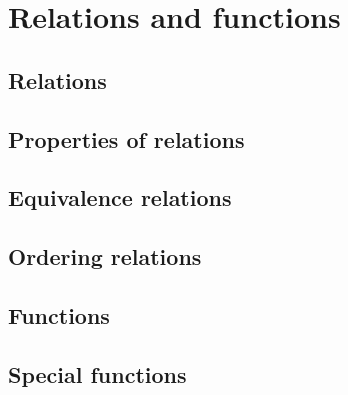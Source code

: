 
\chapter{Relations and functions}

\section{Relations}





\newpage

\section{Properties of relations}





\newpage

\section{Equivalence relations}
\label{sec:eq_rel}




\newpage

\section{Ordering relations}
\label{sec:ord_rel}




\newpage

\section{Functions}
\label{sec:functions}





\newpage

\section{Special functions}
\label{sec:special_functions}




